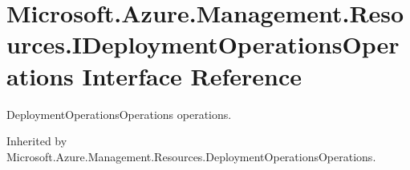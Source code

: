 \hypertarget{interface_microsoft_1_1_azure_1_1_management_1_1_resources_1_1_i_deployment_operations_operations}{}\section{Microsoft.\+Azure.\+Management.\+Resources.\+I\+Deployment\+Operations\+Operations Interface Reference}
\label{interface_microsoft_1_1_azure_1_1_management_1_1_resources_1_1_i_deployment_operations_operations}


Deployment\+Operations\+Operations operations.  




Inherited by Microsoft.\+Azure.\+Management.\+Resources.\+Deployment\+Operations\+Operations.

